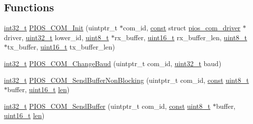 \subsection*{Functions}
\begin{DoxyCompactItemize}
\item 
\hyperlink{group___n_a_m_e_gafd12020da5a235dfcf0c3c748fb5baed}{int32\-\_\-t} \hyperlink{group___p_i_o_s___c_o_m_gae5f5c6d4dd82ce508ba42da9c90a7166}{P\-I\-O\-S\-\_\-\-C\-O\-M\-\_\-\-Init} (uintptr\-\_\-t $\ast$com\-\_\-id, \hyperlink{group___n_a_m_e_ga7ae6d0e43244213b34de2c2b9aa30da6}{const} struct \hyperlink{structpios__com__driver}{pios\-\_\-com\-\_\-driver} $\ast$driver, \hyperlink{stdint_8h_a435d1572bf3f880d55459d9805097f62}{uint32\-\_\-t} lower\-\_\-id, \hyperlink{stdint_8h_aba7bc1797add20fe3efdf37ced1182c5}{uint8\-\_\-t} $\ast$rx\-\_\-buffer, \hyperlink{stdint_8h_a273cf69d639a59973b6019625df33e30}{uint16\-\_\-t} rx\-\_\-buffer\-\_\-len, \hyperlink{stdint_8h_aba7bc1797add20fe3efdf37ced1182c5}{uint8\-\_\-t} $\ast$tx\-\_\-buffer, \hyperlink{stdint_8h_a273cf69d639a59973b6019625df33e30}{uint16\-\_\-t} tx\-\_\-buffer\-\_\-len)
\item 
\hyperlink{group___n_a_m_e_gafd12020da5a235dfcf0c3c748fb5baed}{int32\-\_\-t} \hyperlink{group___p_i_o_s___c_o_m_gaa370cb6fb2677b6260ae4204ba26b2b3}{P\-I\-O\-S\-\_\-\-C\-O\-M\-\_\-\-Change\-Baud} (uintptr\-\_\-t com\-\_\-id, \hyperlink{stdint_8h_a435d1572bf3f880d55459d9805097f62}{uint32\-\_\-t} baud)
\item 
\hyperlink{group___n_a_m_e_gafd12020da5a235dfcf0c3c748fb5baed}{int32\-\_\-t} \hyperlink{group___p_i_o_s___c_o_m_ga60982fe515c4938f64fd872b8992a55b}{P\-I\-O\-S\-\_\-\-C\-O\-M\-\_\-\-Send\-Buffer\-Non\-Blocking} (uintptr\-\_\-t com\-\_\-id, \hyperlink{group___n_a_m_e_ga7ae6d0e43244213b34de2c2b9aa30da6}{const} \hyperlink{stdint_8h_aba7bc1797add20fe3efdf37ced1182c5}{uint8\-\_\-t} $\ast$buffer, \hyperlink{stdint_8h_a273cf69d639a59973b6019625df33e30}{uint16\-\_\-t} \hyperlink{mavlink__helpers_8h_aba59486c1504340293255a065b546e3a}{len})
\item 
\hyperlink{group___n_a_m_e_gafd12020da5a235dfcf0c3c748fb5baed}{int32\-\_\-t} \hyperlink{group___p_i_o_s___c_o_m_ga06a9a4136683f78051b9e72e5edb32f8}{P\-I\-O\-S\-\_\-\-C\-O\-M\-\_\-\-Send\-Buffer} (uintptr\-\_\-t com\-\_\-id, \hyperlink{group___n_a_m_e_ga7ae6d0e43244213b34de2c2b9aa30da6}{const} \hyperlink{stdint_8h_aba7bc1797add20fe3efdf37ced1182c5}{uint8\-\_\-t} $\ast$buffer, \hyperlink{stdint_8h_a273cf69d639a59973b6019625df33e30}{uint16\-\_\-t} \hyperlink{mavlink__helpers_8h_aba59486c1504340293255a065b546e3a}{len})

\end{DoxyCompactItemize}
